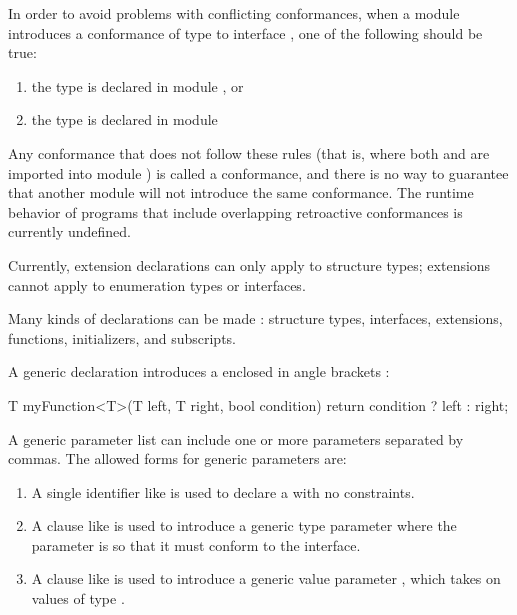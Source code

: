 In order to avoid problems with conflicting conformances, when a module  introduces a conformance of type  to interface , one of the following should be true:
\begin{enumerate}
    \item{the type  is declared in module , or}
    \item{the type  is declared in module }
\end{enumerate}

Any conformance that does not follow these rules (that is, where both  and  are imported into module ) is called a  conformance, and there is no way to guarantee that another module  will not introduce the same conformance.
The runtime behavior of programs that include overlapping retroactive conformances is currently undefined.

Currently, extension declarations can only apply to structure types; extensions cannot apply to enumeration types or interfaces.


Many kinds of declarations can be made : structure types, interfaces, extensions, functions, initializers, and subscripts.

A generic declaration introduces a  enclosed in angle brackets \Char{<>}:

\begin{codeblock}
T myFunction<T>(T left, T right, bool condition)
{
    return condition ? left : right;
}
\end{codeblock}


A generic parameter list can include one or more parameters separated by commas.
The allowed forms for generic parameters are:
\begin{enumerate}
    \item{A single identifier like  is used to declare a  with no constraints.}
    \item{A clause like  is used to introduce a generic type parameter  where the parameter is  so that it must conform to the  interface.}
    \item{A clause like  is used to introduce a generic value parameter , which takes on values of type .}
\end{enumerate}

